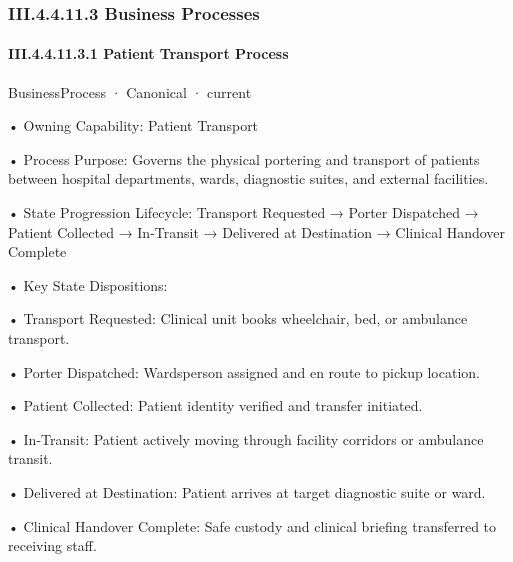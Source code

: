 \subsubsection*{III.4.4.11.3 Business Processes}
\label{navigation:III.4.4.11.3}

\paragraph*{III.4.4.11.3.1 Patient Transport Process}
\label{navigation:III.4.4.11.3.1}

\label{element:f2e58fd18cd94b0faaa364d3890a7c9e}
{\small BusinessProcess · Canonical · current}\par

•
Owning Capability: Patient Transport



•
Process Purpose: Governs the physical portering and transport of patients between hospital departments, wards, diagnostic suites, and external facilities.



•
State Progression Lifecycle: Transport Requested → Porter Dispatched → Patient Collected → In-Transit → Delivered at Destination → Clinical Handover Complete



•
Key State Dispositions:



•
Transport Requested: Clinical unit books wheelchair, bed, or ambulance transport.



•
Porter Dispatched: Wardsperson assigned and en route to pickup location.



•
Patient Collected: Patient identity verified and transfer initiated.



•
In-Transit: Patient actively moving through facility corridors or ambulance transit.



•
Delivered at Destination: Patient arrives at target diagnostic suite or ward.



•
Clinical Handover Complete: Safe custody and clinical briefing transferred to receiving staff.



